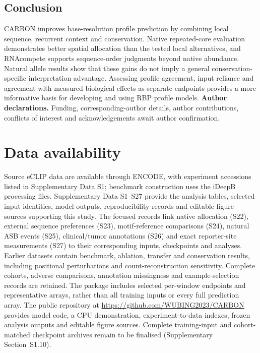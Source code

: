 \documentclass[webpdf,contemporary,large]{oup-authoring-template}
\newcommand{\supsect}[1]{Supplementary Section~#1}
\begin{document}
\subsection{Conclusion}

CARBON improves base-resolution profile prediction by combining local sequence, recurrent context and conservation. Native repeated-core evaluation demonstrates better spatial allocation than the tested local alternatives, and RNAcompete supports sequence-order judgments beyond native abundance. Natural allele results show that these gains do not imply a general conservation-specific interpretation advantage. Assessing profile agreement, input reliance and agreement with measured biological effects as separate endpoints provides a more informative basis for developing and using RBP profile models.
\noindent\textbf{Author declarations.} Funding, corresponding-author details, author contributions, conflicts of interest and acknowledgements await author confirmation.

\section*{Data availability}

Source eCLIP data are available through ENCODE, with experiment accessions listed in Supplementary Data S1; benchmark construction uses the iDeepB processing files. Supplementary Data S1--S27 provide the analysis tables, selected input identities, model outputs, reproducibility records and editable figure sources supporting this study. The focused records link native allocation (S22), external sequence preferences (S23), motif-reference comparisons (S24), natural ASB events (S25), clinical/tumor annotations (S26) and exact reporter-site measurements (S27) to their corresponding inputs, checkpoints and analyses. Earlier datasets contain benchmark, ablation, transfer and conservation results, including positional perturbations and count-reconstruction sensitivity. Complete cohorts, adverse comparisons, annotation missingness and example-selection records are retained. The package includes selected per-window endpoints and representative arrays, rather than all training inputs or every full prediction array. The public repository at \url{https://github.com/WUBING2023/CARBON} provides model code, a CPU demonstration, experiment-to-data indexes, frozen analysis outputs and editable figure sources. Complete training-input and cohort-matched checkpoint archives remain to be finalised (\supsect{S1.10}).


{\small}
\end{document}
